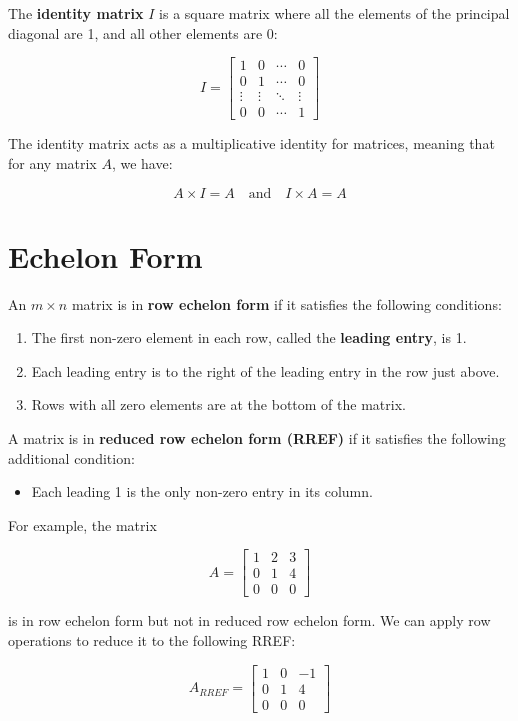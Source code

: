 \documentclass{article}
\begin{document}
The \textbf{identity matrix} \( I \) is a square matrix where all the elements of the principal diagonal are 1, and all other elements are 0:

\[
I = \begin{bmatrix}
1 & 0 & \cdots & 0 \\
0 & 1 & \cdots & 0 \\
\vdots & \vdots & \ddots & \vdots \\
0 & 0 & \cdots & 1
\end{bmatrix}
\]

The identity matrix acts as a multiplicative identity for matrices, meaning that for any matrix \( A \), we have:

\[
A \times I = A \quad \text{and} \quad I \times A = A
\]

\section{Echelon Form}
An \( m \times n \) matrix is in \textbf{row echelon form} if it satisfies the following conditions:

\begin{enumerate}
    \item The first non-zero element in each row, called the \textbf{leading entry}, is 1.
    \item Each leading entry is to the right of the leading entry in the row just above.
    \item Rows with all zero elements are at the bottom of the matrix.
\end{enumerate}

A matrix is in \textbf{reduced row echelon form (RREF)} if it satisfies the following additional condition:
\begin{itemize}
    \item Each leading 1 is the only non-zero entry in its column.
\end{itemize}

For example, the matrix

\[
A = \begin{bmatrix}
1 & 2 & 3 \\
0 & 1 & 4 \\
0 & 0 & 0
\end{bmatrix}
\]

is in row echelon form but not in reduced row echelon form. We can apply row operations to reduce it to the following RREF:

\[
A_{RREF} = \begin{bmatrix}
1 & 0 & -1 \\
0 & 1 & 4 \\
0 & 0 & 0
\end{bmatrix}
\]
\end{document}
